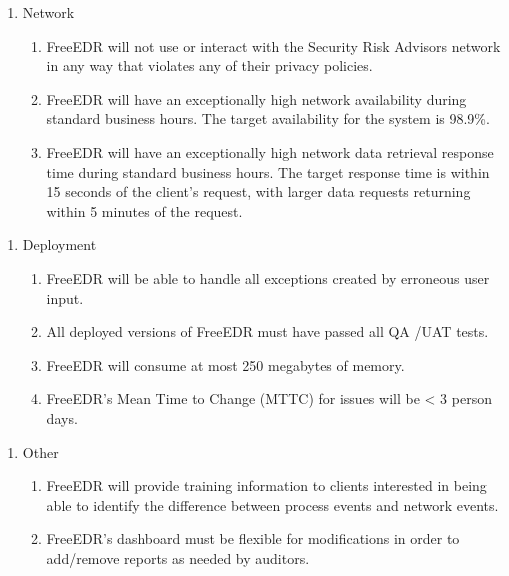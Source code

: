 \documentclass{scrreprt}
\begin{document}
\begin{enumerate}[resume*]
    \item Network
    \begin{enumerate}[label*=\arabic*.]
\item FreeEDR will not use or interact with the Security Risk Advisors network in any way that violates any of their privacy policies. 
\item FreeEDR will have an exceptionally high network availability during standard business hours. The target availability for the system is 98.9\%.
\item FreeEDR will have an exceptionally high network data retrieval response time during standard business hours. The target response time is within 15 seconds of the client’s request, with larger data requests returning within 5 minutes of the request.

    \end{enumerate}
\end{enumerate}

\begin{enumerate}[resume*]
    \item Deployment
    \begin{enumerate}[label*=\arabic*.]
\item FreeEDR will be able to handle all exceptions created by erroneous user input. 
\item All deployed versions of FreeEDR must have passed all QA /UAT tests.
\item FreeEDR will consume at most 250 megabytes of memory.
\item FreeEDR’s Mean Time to Change (MTTC) for issues will be < 3 person days. 

    \end{enumerate}
\end{enumerate}

\begin{enumerate}[resume*]
    \item Other
    \begin{enumerate}[label*=\arabic*.]
\item FreeEDR will provide training information to clients interested in being able to identify the difference between process events and network events.
\item FreeEDR’s dashboard must be flexible for modifications in order to add/remove reports as needed by auditors.
    \end{enumerate}
\end{enumerate}
\end{document}
